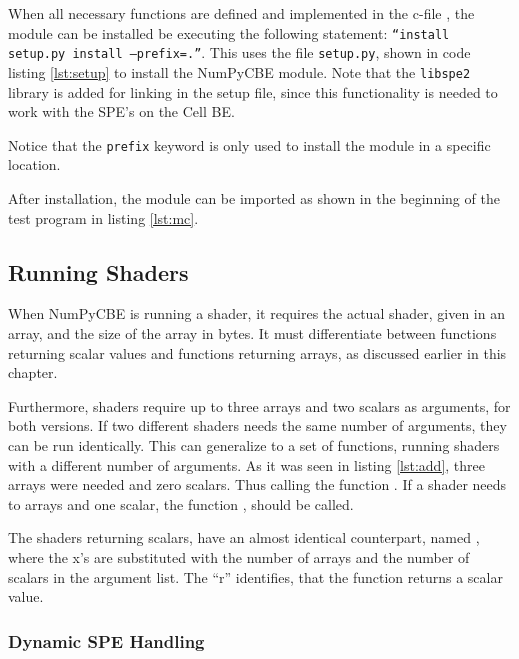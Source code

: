 
When all necessary functions are defined and implemented in the c-file ,
the module can be installed be executing the following statement: \texttt{``install setup.py install --prefix=.''}.
This uses the file \texttt{setup.py}, shown in code listing \ref{lst:setup} to install the NumPyCBE module.
Note that the \texttt{libspe2} library is added for linking in the setup file, since this functionality is needed
to work with the SPE's on the Cell BE.


Notice that the \texttt{prefix} keyword is only used to install the module in a specific location.

After installation, the module can be imported as shown in the
beginning of the test program in listing \ref{lst:mc}.

\subsection{Running Shaders}
\label{sec:runshaders}

When NumPyCBE is running a shader, it requires the actual shader,
given in an array, and the size of the array in bytes. It must
differentiate between functions returning scalar values and
functions returning arrays, as discussed earlier in this chapter.

Furthermore, shaders require up to three arrays and two scalars as
arguments, for both versions. If two different shaders needs the same
number of arguments, they can be run identically. This can generalize
to a set of functions, running shaders with a different number of
arguments. As it was seen in listing \ref{lst:add}, three arrays were
needed and zero scalars. Thus calling the function
. If a shader needs to arrays and one scalar, the
function , should be called. 

The shaders returning scalars, have an almost identical counterpart,
named , where the x's are substituted with the
number of arrays and the number of scalars in the argument list. The
``r'' identifies, that the function returns a scalar value.

\subsubsection{Dynamic SPE Handling}

